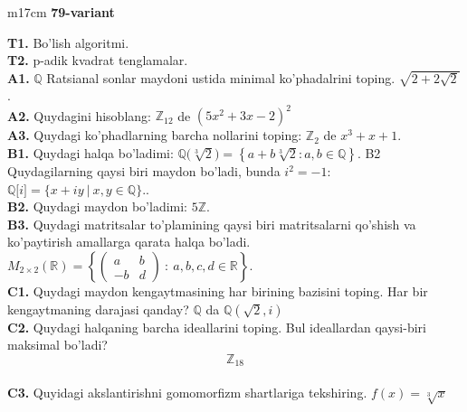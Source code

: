 \documentclass{article}
\begin{document}
\begin{tabular}{m{17cm}}
\textbf{79-variant}
\newline

\textbf{T1.} Bo'lish algoritmi. \\
\textbf{T2.} p-adik kvadrat tenglamalar. \\
\textbf{A1.} \(\mathbb{Q}\) Ratsianal sonlar maydoni ustida minimal ko'phadalrini toping.
\(\sqrt{2 + 2\sqrt{2}}\). \\
\textbf{A2.} Quydagini hisoblang:
\(\mathbb{Z}_{12}\) de \(\left( 5x^{2} + 3x - 2 \right)^{2}\) \\
\textbf{A3.} Quydagi ko'phadlarning barcha nollarini toping:
\(\mathbb{Z}_{2}\) de \(x^{3} + x + 1\). \\
\textbf{B1.} Quydagi halqa bo'ladimi:
\(\mathbb{Q(}\sqrt[3]{2}) = \left\{ a + b\sqrt[3]{2}:a,b \in \mathbb{Q} \right\}\).
B2 Quydagilarning qaysi biri maydon bo'ladi, bunda \(i^{2} = - 1\):
\(\mathbb{Q\lbrack}i\rbrack = \{ x + iy\ |\ x,y \in \mathbb{Q\}}\).. \\
\textbf{B2.} Quydagi maydon bo'ladimi:
\(5\mathbb{Z}\). \\
\textbf{B3.} Quydagi matritsalar to'plamining qaysi biri matritsalarni qo'shish va ko'paytirish amallarga qarata halqa bo'ladi.
\(M_{2 \times 2}\mathbb{(R) =}\left\{ \begin{pmatrix}
a & b \\
 - b & d
\end{pmatrix}\ :\ a,b,c,d \in \mathbb{R} \right\}\). \\
\textbf{C1.} Quydagi maydon kengaytmasining har birining bazisini toping. Har bir kengaytmaning darajasi qanday?
\(\mathbb{Q}\) da \(\mathbb{Q}\left( \sqrt{2},i \right)\) \\
\textbf{C2.} Quydagi halqaning barcha ideallarini toping. Bul ideallardan qaysi-biri maksimal bo'ladi?
\[\mathbb{Z}_{18}\] \\
\textbf{C3.} Quyidagi akslantirishni gomomorfizm shartlariga tekshiring. \(f(x) = \sqrt[3]{x}\) \\

\end{tabular}
\vspace{1cm}
\end{document}
